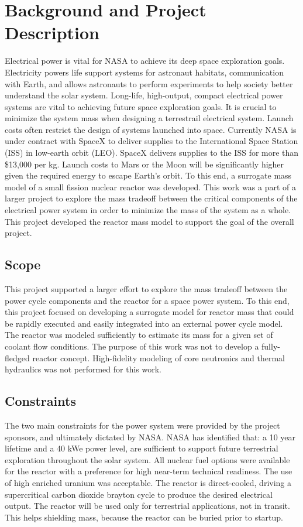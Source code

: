 \chapter{Background and Project Description}
Electrical power is vital for NASA to achieve its deep space exploration goals.
Electricity powers life support systems for astronaut habitats, communication
with Earth, and allows astronauts to perform experiments to help society better
understand the solar system. Long-life, high-output, compact electrical power
systems are vital to achieving future space exploration goals. It is crucial to
minimize the system mass when designing a terrestrail electrical system. Launch costs 
often restrict the design of systems launched
into space. Currently NASA is under contract with SpaceX to deliver supplies to
the International Space Station (ISS) in low-earth orbit (LEO). SpaceX delivers
supplies to the ISS for more than \$13,000 per kg\citep{spacex}. Launch costs to Mars or the
Moon will be significantly higher given the required energy to escape Earth's
orbit. To this end, a surrogate mass model of a small fission
nuclear reactor was developed. This work was a part of a larger
project to explore the mass tradeoff between the critical components of the
electrical power system in order to minimize the mass of the system as a whole.
This project developed the reactor mass model to support the goal of the overall
project.

\section{Scope}
This project supported a larger effort to explore the mass tradeoff between the
power cycle components and the reactor for a space power system. To this end,
this project focused on developing a surrogate model for reactor mass that could
be rapidly executed and easily integrated into an external power cycle model.
The reactor was modeled sufficiently to estimate its mass for a given set of
coolant flow conditions.
The purpose of this work was not to develop a fully-fledged reactor concept.
High-fidelity modeling of core neutronics and thermal hydraulics was not
performed for this work.

\section{Constraints}
The two main constraints for the power system were provided by the project sponsors,
and ultimately dictated by NASA. NASA has identified that: a 10 year lifetime 
and a 40 kWe power level, are sufficient to
support future terrestrial exploration throughout the solar system. All nuclear fuel
options were available for the reactor with a preference for high near-term
technical readiness. The use of high enriched uranium was acceptable. 
The reactor is direct-cooled, driving a
supercritical carbon dioxide brayton cycle to produce the desired electrical
output. The reactor will be used only for terrestrial applications, not in
transit. This helps shielding mass, because the reactor can be buried prior to
startup.

